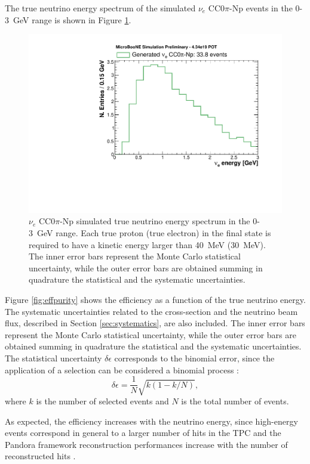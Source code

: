 The true neutrino energy spectrum of the simulated $\nu_{e}$ CC$0\pi$-Np events in the 0-3~GeV range is shown in Figure \ref{fig:true_energy}.

\begin{figure}
\centering
  \includegraphics[width=0.8\linewidth]{figures/tot.pdf}
  \caption{$\nu_{e}$ CC$0\pi$-Np simulated true neutrino energy spectrum in the 0-3~GeV range. Each true proton (true electron) in the final state is required to have a kinetic energy larger than 40~MeV (30~MeV). The inner error bars represent the Monte Carlo statistical uncertainty, while the outer error bars are obtained summing in quadrature the statistical and the systematic uncertainties.}
  \label{fig:true_energy}
\end{figure}

Figure \ref{fig:effpurity} shows the efficiency as a function of the true neutrino energy.
The systematic uncertainties related to the cross-section and the neutrino beam flux, described in Section \ref{sec:systematics}, are also included. The inner error bars represent the Monte Carlo statistical uncertainty, while the outer error bars are obtained summing in quadrature the statistical and the systematic uncertainties. The statistical uncertainty $\delta\epsilon$ corresponds to the binomial error, since the application of a selection can be considered a binomial process \cite{Paterno:2004cb}:
\begin{equation}
    \delta\epsilon = \frac{1}{N}\sqrt{k(1-k/N)},
\end{equation}
where $k$ is the number of selected events and $N$ is the total number of events.

As expected, the efficiency increases with the neutrino energy, since high-energy events correspond in general to a larger number of hits in the TPC and the Pandora framework reconstruction performances increase with the number of reconstructed hits \cite{Acciarri:2017hat}. 


